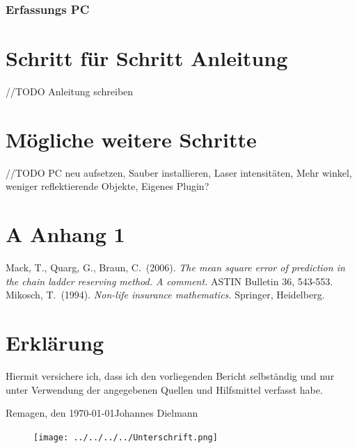 \documentclass[11pt,twoside]{report}
\begin{document}
\subsubsection{Erfassungs PC}
\newpage

\section{Schritt für Schritt Anleitung}
//TODO Anleitung schreiben

\section{Mögliche weitere Schritte}
//TODO PC neu aufsetzen, Sauber installieren, Laser intensitäten, Mehr winkel, weniger reflektierende Objekte, Eigenes Plugin?

\section*{A Anhang 1}
\newpage

\begin{thebibliography}{99}
 Mack, T., Quarg, G., Braun, C.\ (2006). {\em The mean square error of prediction in the chain ladder reserving method. A comment.} ASTIN Bulletin 36, 543-553. 
 Mikosch, T.\ (1994). {\em Non-life insurance mathematics.} Springer, Heidelberg.
\end{thebibliography}
\newpage

\section*{Erklärung}

\vspace{2cm}

Hiermit versichere ich, dass ich den vorliegenden Bericht selbständig und nur unter Verwendung der angegebenen Quellen und Hilfsmittel verfasst habe.

\vspace{2cm}

Remagen, den \today \hfill {Johannes Dielmann} 
\begin{figure}[hp]
	\hfill
	\texttt{[image: ../../../../Unterschrift.png]}
\end{figure}
\end{document}
